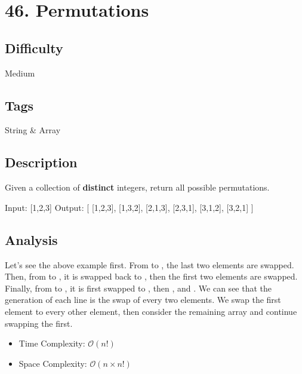 \tocless\section{46. Permutations}
\label{algo:46}

\subsection*{Difficulty}
Medium

\subsection*{Tags}
String \& Array

\subsection*{Description}
Given a collection of \textbf{distinct} integers, return all possible permutations.

\begin{example}
\begin{multilinecode}
Input: [1,2,3]
Output:
[
    [1,2,3],
    [1,3,2],
    [2,1,3],
    [2,3,1],
    [3,1,2],
    [3,2,1]
]
\end{multilinecode}

\end{example}

\subsection*{Analysis}
Let's see the above example first. From \inlinecode{[1, 2, 3]} to \inlinecode{[1, 3, 2]}, the last two elements are swapped. Then, from \inlinecode{[1, 3, 2]} to \inlinecode{[2, 1, 3]}, it is swapped back to \inlinecode{[1, 2, 3]}, then the first two elements are swapped. Finally, from \inlinecode{[2, 3, 1]} to \inlinecode{[3, 1, 2]}, it is first swapped to \inlinecode{[2, 1, 3]}, then \inlinecode{[1, 2, 3]}, and \inlinecode{[3, 1, 2]}. We can see that the generation of each line is the swap of every two elements. We swap the first element to every other element, then consider the remaining array and continue swapping the first.

\begin{itemize}
    \item Time Complexity: $\mathcal{O}(n!)$
    \item Space Complexity: $\mathcal{O}(n\times n!)$
\end{itemize}

